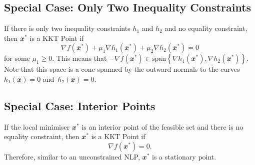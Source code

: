 \documentclass[math, code]{amznotes}
\theoremstyle{remark}
\begin{document}
\subsection{Special Case: Only Two Inequality Constraints}
If there is only two inequality constraints $h_1$ and $h_2$ and no equality constraint, then $\mathbfit{x}^*$ is a KKT Point if
\begin{equation*}
    \nabla f(\mathbfit{x}^*) + \mu_1\nabla h_1(\mathbfit{x}^*) + \mu_2\nabla h_2(\mathbfit{x}^*) = 0
\end{equation*}
for some $\mu_1 \geq 0$. This means that $-\nabla f(\mathbfit{x}^*) \in \mathrm{span}\left\{\nabla h_1(\mathbfit{x}^*), \nabla h_2(\mathbfit{x}^*)\right\}$. Note that this space is a cone spanned by the outward normals to the curves $h_1(\mathbfit{x}) = 0$ and~$h_2(\mathbfit{x}) = 0$.

\subsection{Special Case: Interior Points}
If the local minimiser $\mathbfit{x}^*$ is an interior point of the feasible set and there is no equality constraint, then $\mathbfit{x}^*$ is a KKT Point if 
\begin{equation*}
    \nabla f(\mathbfit{x}^*) = 0.
\end{equation*}
Therefore, similar to an unconstrained NLP, $\mathbfit{x}^*$ is a stationary point.
\end{document}

